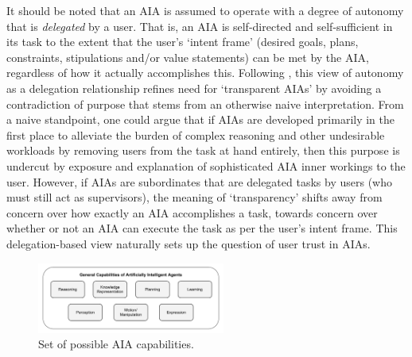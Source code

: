     It should be noted that an AIA is assumed to operate with a degree of autonomy that is \emph{delegated} by a user. That is, an AIA is self-directed and self-sufficient in its task to the extent that the user's `intent frame' (desired goals, plans, constraints, stipulations and/or value statements) can be met by the AIA, regardless of how it actually accomplishes this. %
    Following \citet{Miller2014-av}, this view of autonomy as a delegation relationship refines need for `transparent AIAs' by avoiding a contradiction of purpose that stems from an otherwise naive interpretation. From a naive standpoint, one could argue that if AIAs are developed primarily in the first place to alleviate the burden of complex reasoning and other undesirable workloads by removing users from the task at hand entirely, then this purpose is undercut by exposure and explanation of sophisticated AIA inner workings to the user. 
    However, if AIAs are subordinates that are delegated tasks by users (who must still act as supervisors), the meaning of `transparency' shifts away from concern over how exactly an AIA accomplishes a task, towards concern over whether or not an AIA can execute the task as per the user's intent frame. 
    This delegation-based view naturally sets up the question of user trust in AIAs. 

	\begin{figure}[t!]%
    	\centering
     	\includegraphics[width=0.55\textwidth]{Figures/AI_capabilities}
    	\caption{Set of possible AIA capabilities.}
        \label{fig:AIcapabilities}
    \end{figure}


